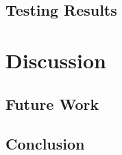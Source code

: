 \documentclass[conference]{IEEEtran}
\begin{document}
\subsection{Testing Results}


\section{Discussion}
\subsection{Future Work}
\label{future_work}

\subsection{Conclusion}





\end{document}
